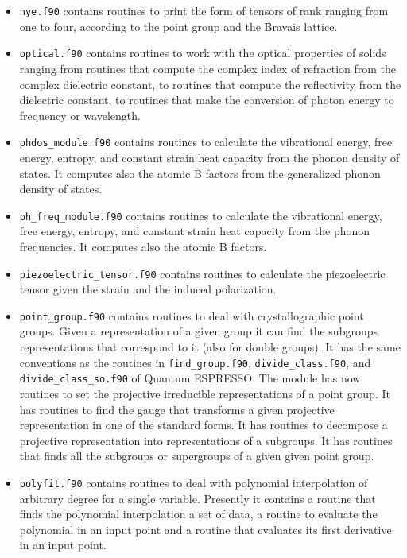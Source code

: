 \documentclass[12pt,a4paper]{article}
\def\qe{{\sc Quantum ESPRESSO}}
\begin{document}
\begin{itemize}
\item
\texttt{nye.f90} contains routines to print the form of tensors of
rank ranging from one to four, according to the point group and the
Bravais lattice.

\item
\texttt{optical.f90} contains routines to work with the optical properties
of solids ranging from routines that compute the complex index of refraction
from the complex dielectric constant, to routines that compute the
reflectivity from the dielectric constant, to routines that make
the conversion of photon energy to frequency or wavelength.

\item
\texttt{phdos\_module.f90} contains routines to calculate the vibrational
energy, free energy, entropy, and constant strain heat capacity from the
phonon density of states. It computes also the atomic B factors from the
generalized phonon density of states.

\item
\texttt{ph\_freq\_module.f90} contains routines to calculate the vibrational
energy, free energy, entropy, and constant strain heat capacity from the
phonon frequencies. It computes also the atomic B factors.

\item
\texttt{piezoelectric\_tensor.f90} contains routines to calculate the
piezoelectric tensor given the strain and the induced polarization.

\item
\texttt{point\_group.f90} contains routines to deal with crystallographic
point groups. Given a representation of a given group it can find 
the subgroups representations that correspond to it (also for
double groups). It has the same conventions as the routines 
in \texttt{find\_group.f90}, \texttt{divide\_class.f90}, and 
\texttt{divide\_class\_so.f90} of \qe. The module has now routines to
set the projective irreducible representations of a point group.
It has routines to find the gauge that transforms a given projective
representation in one of the standard forms. It has routines to decompose
a projective representation into representations of a subgroups.
It has routines that finds all the subgroups or supergroups of a given given
point group.

\item
\texttt{polyfit.f90} contains routines to deal with polynomial
interpolation of arbitrary degree for a single variable. Presently
it contains a routine that finds the polynomial interpolation a set of data,
a routine to evaluate the polynomial in an input point and a routine
that evaluates its first derivative in an input point.


\end{itemize}
\end{document}

